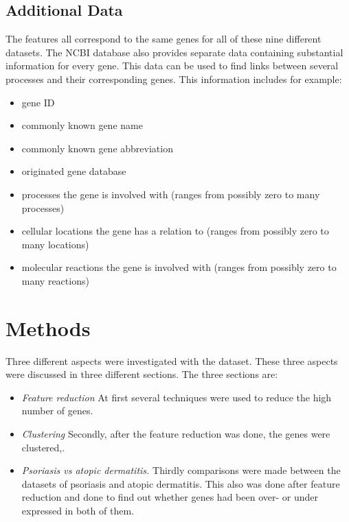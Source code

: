 \documentclass[10pt,a4paper]{report}
\begin{document}
	\subsection{Additional Data}
	\label{subsec:AdditionalData}
	
	The features all correspond to the same genes for all of these nine different datasets. The NCBI database \cite{edgar2002gene} also provides separate data containing substantial information for every gene. This data can be used to find links between several processes and their corresponding genes. This information includes for example:
	
	\begin{itemize}
		\item gene ID
		\item commonly known gene name
		\item commonly known gene abbreviation
		\item originated gene database
		\item processes the gene is involved with (ranges from possibly zero to many processes)
		\item cellular locations the gene has a relation to (ranges from possibly zero to many locations)
		\item molecular reactions the gene is involved with (ranges from possibly zero to many reactions)
	\end{itemize}
	
	\section{Methods}
	\label{sec:Methods}
	
	Three different aspects were investigated with the dataset. These three aspects were discussed in three different sections. The three sections are:
	\begin{itemize}
		\item  \textit{Feature reduction} At first several techniques were used to reduce the high number of genes.
		\item  \textit{Clustering}	Secondly, after the feature reduction was done, the genes were clustered,.
		\item	\textit{Psoriasis vs atopic dermatitis.} Thirdly comparisons were made between the datasets of psoriasis and atopic dermatitis. This also was done after feature reduction and done to find out whether genes had been over- or under expressed in both of them.
	\end{itemize} 
	
\end{document}
